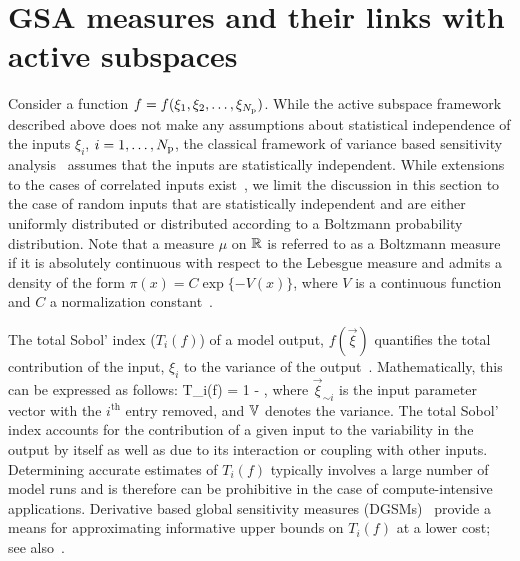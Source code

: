   

\section{GSA measures and their links with active subspaces}
\label{sub:gsa}
Consider a function $f = f(\xi_1, \xi_2, \ldots, \xi_{N_\text{p}})$. 
While the active subspace framework described above does not make any assumptions
about statistical independence of the inputs $\xi_i$, $i = 1, \ldots, {N_\text{p}}$, 
the classical 
framework of variance based sensitivity analysis~\cite{Sobol:2001, Saltelli:2010} 
assumes that the inputs
are statistically independent. While extensions to the cases 
of correlated inputs exist~\cite{Borgonovo:2007,Li:2010,Jacques:2006,Xu:2007,Hart:2017},
 we limit the discussion in this section to the
case of random inputs that are statistically independent and are 
either uniformly distributed or
distributed according to a Boltzmann probability distribution.
Note that a measure $\mu$
on $\mathbb{R}$ is referred to as a Boltzmann measure if it is 
absolutely continuous with respect to the Lebesgue measure  
and admits a density  of the form $\pi(x) = C \exp\{-V(x)\}$,
where $V$ is a continuous function and $C$ a normalization 
constant~\cite{Lamboni:2013}.


The total Sobol' index ($T_i(f)$) of a model output, $f(\vec\xi)$ quantifies
the total contribution of the input, $\xi_i$ to the variance of the
output~\cite{Sobol:2001}. Mathematically, this can be expressed as follows:
%
\be
T_i(f) = 1 - 
,
\label{eq:total}
\ee
%
where $\vec{\xi}_{\sim i}$ is the input parameter vector with the  
$i^\text{th}$ entry removed, and $\mathbb{V}$ denotes the variance. The total Sobol' index accounts
for the contribution of a given input to the variability in the output by itself
as well as due to its interaction or coupling with other inputs. 
Determining accurate estimates of $T_i(f)$ typically involves a large 
number of 
model runs and is therefore can be prohibitive in the case of
compute-intensive applications. Derivative based 
global sensitivity measures (DGSMs)~\cite{Sobol:2009} provide a means for
approximating informative upper bounds on $T_i(f)$ at a lower cost; see 
also~\cite{Vohra:2018}. 


